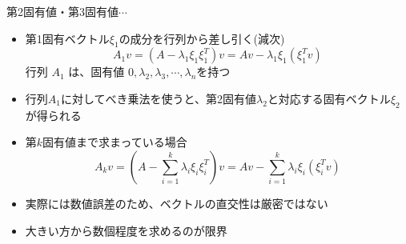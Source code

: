 \begin{frame}[t,fragile]{第2固有値・第3固有値$\cdots$}
  \begin{itemize}
  \item 第1固有ベクトル$\xi_1$の成分を行列から差し引く(減次)
    \[
    A_1 v = (A - \lambda_1 \xi_1 \xi_1^T) v = A v - \lambda_1 \xi_1 (\xi_1^T v)
    \]
    行列 $A_1$ は、固有値 $0,\lambda_2,\lambda_3,\cdots,\lambda_n$を持つ
  \item 行列$A_1$に対してべき乗法を使うと、第2固有値$\lambda_2$と対応する固有ベクトル$\xi_2$が得られる
  \item 第$k$固有値まで求まっている場合
    \[
    A_k v = (A - \sum_{i=1}^k \lambda_i \xi_i \xi_i^T)v = A v - \sum_{i=1}^k \lambda_i \xi_i (\xi_i^T v)
    \]
  \item 実際には数値誤差のため、ベクトルの直交性は厳密ではない
  \item 大きい方から数個程度を求めるのが限界
  \end{itemize}
\end{frame}
